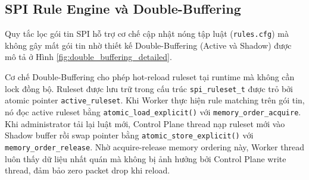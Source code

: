 \documentclass[12pt,a4paper,twoside]{report}
\begin{document}
\subsection{SPI Rule Engine và Double-Buffering}
Quy tắc lọc gói tin SPI hỗ trợ cơ chế cập nhật nóng tập luật (\texttt{rules.cfg}) mà không gây mất gói tin nhờ thiết kế Double-Buffering (Active và Shadow) được mô tả ở Hình \ref{fig:double_buffering_detailed}.

Cơ chế Double-Buffering cho phép hot-reload ruleset tại runtime mà không cần lock đồng bộ. Ruleset được lưu trữ trong cấu trúc \texttt{spi\_ruleset\_t} được trỏ bởi atomic pointer \texttt{active\_\allowbreak ruleset}. Khi Worker thực hiện rule matching trên gói tin, nó đọc active ruleset bằng \texttt{atomic\_\allowbreak load\_\allowbreak explicit()} với \texttt{memory\_\allowbreak order\_\allowbreak acquire}. Khi administrator tải lại luật mới, Control Plane thread nạp ruleset mới vào Shadow buffer rồi swap pointer bằng \texttt{atomic\_\allowbreak store\_\allowbreak explicit()} với \texttt{memory\_\allowbreak order\_\allowbreak release}. Nhờ acquire-release memory ordering này, Worker thread luôn thấy dữ liệu nhất quán mà không bị ảnh hưởng bởi Control Plane write thread, đảm bảo zero packet drop khi reload.
\end{document}
